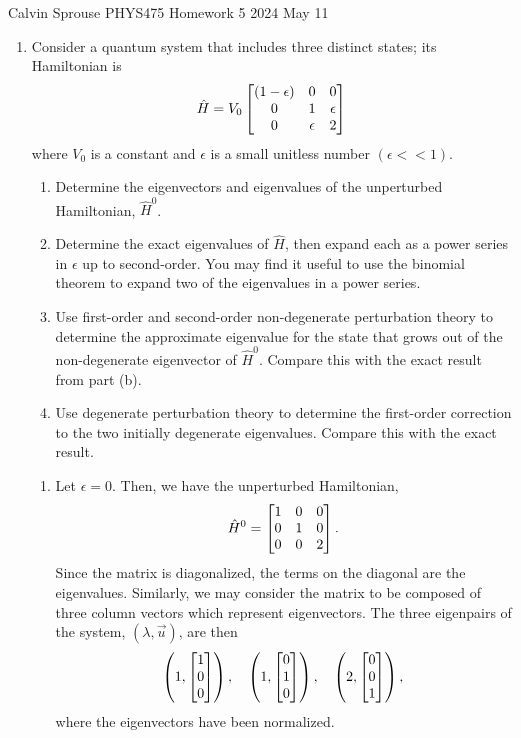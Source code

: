\documentclass[a4paper, 12pt]{config/homework}
\begin{document}
\noindent
Calvin Sprouse \hfill PHYS475 Homework 5 \hfill 2024 May 11
\bigskip

\begin{enumerate}
\item Consider a quantum system that includes three distinct states; its Hamiltonian is
\[\hat{H} = V_0 \left[ \begin{matrix} (1-\epsilon) & 0 & 0 \\ 0 & 1 & \epsilon \\ 0 & \epsilon & 2 \end{matrix} \right]\]
where \(V_0\) is a constant and \(\epsilon\) is a small unitless number \(\left(\epsilon << 1\right)\).
\begin{enumerate}[label=(\alph*)]
\item Determine the eigenvectors and eigenvalues of the unperturbed Hamiltonian, \(\hat{H}^0\).
\item Determine the exact eigenvalues of \(\hat{H}\), then expand each as a power series in \(\epsilon\) up to second-order. You may find it useful to use the binomial theorem to expand two of the eigenvalues in a power series.
\item Use first-order and second-order non-degenerate perturbation theory to determine the approximate eigenvalue for the state that grows out of the non-degenerate eigenvector of \(\hat{H}^0\). Compare this with the exact result from part (b).
\item Use degenerate perturbation theory to determine the first-order correction to the two initially degenerate eigenvalues. Compare this with the exact result.
\end{enumerate}
\bigskip
\begin{enumerate}[label=(\alph*)]
\item Let \(\epsilon = 0\). Then, we have the unperturbed Hamiltonian,
\[\hat{H}^0 = \left[ \begin{matrix} 1 & 0 & 0 \\ 0 & 1 & 0 \\ 0 & 0 & 2 \end{matrix} \right].\]
Since the matrix is diagonalized, the terms on the diagonal are the eigenvalues. Similarly, we may consider the matrix to be composed of three column vectors which represent eigenvectors. The three eigenpairs of the system, \(\left(\lambda, \vec{u}\right)\), are then
\[  \left(1, \left[ \begin{matrix} 1 \\ 0 \\ 0 \end{matrix} \right]\right), \quad
    \left(1, \left[ \begin{matrix} 0 \\ 1 \\ 0 \end{matrix} \right]\right), \quad
    \left(2, \left[ \begin{matrix} 0 \\ 0 \\ 1 \end{matrix} \right]\right), \]
where the eigenvectors have been normalized.


\end{enumerate}
\end{enumerate}
\end{document}

